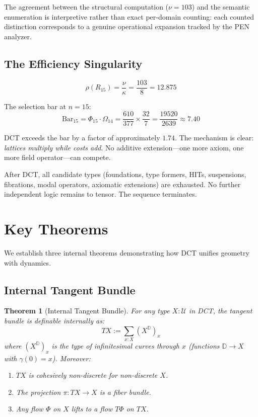 \documentclass[11pt,a4paper]{article}
\theoremstyle{plain}
\newtheorem{theorem}{Theorem}[section]
\theoremstyle{definition}
\theoremstyle{remark}
\newcommand{\D}{\mathbb{D}}
\newcommand{\U}{\mathcal{U}}
\begin{document}
The agreement between the structural computation ($\nu=103$) and the semantic enumeration is interpretive rather than exact per-domain counting: each counted distinction corresponds to a genuine operational expansion tracked by the PEN analyzer.

\subsection{The Efficiency Singularity}

\begin{equation}
    \rho(R_{15}) = \frac{\nu}{\kappa} = \frac{103}{8} = 12.875
\end{equation}

\noindent The selection bar at $n = 15$:
\begin{equation}
    \mathrm{Bar}_{15} = \Phi_{15} \cdot \Omega_{14} = \frac{610}{377} \times \frac{32}{7} = \frac{19520}{2639} \approx 7.40
\end{equation}

DCT exceeds the bar by a factor of approximately $1.74$.
The mechanism is clear: \emph{lattices multiply while costs add}.
No additive extension---one more axiom, one more field operator---can compete.

After DCT, all candidate types (foundations, type formers, HITs, suspensions, fibrations, modal operators, axiomatic extensions) are exhausted.
No further independent logic remains to tensor.
The sequence terminates.

\section{Key Theorems}
\label{sec:theorems}

We establish three internal theorems demonstrating how DCT unifies geometry with dynamics.

\subsection{Internal Tangent Bundle}

\begin{theorem}[Internal Tangent Bundle]
\label{thm:tangent}
For any type $X : \U$ in DCT, the tangent bundle is definable internally as:
\begin{equation}
    TX := \sum_{x : X} (X^{\D})_x
\end{equation}
where $(X^{\D})_x$ is the type of infinitesimal curves through $x$ (functions $\D \to X$ with $\gamma(0) = x$).
Moreover:
\begin{enumerate}[nosep]
    \item $TX$ is cohesively non-discrete for non-discrete $X$.
    \item The projection $\pi : TX \to X$ is a fiber bundle.
    \item Any flow $\Phi$ on $X$ lifts to a flow $T\Phi$ on $TX$.
\end{enumerate}
\end{theorem}
\end{document}
